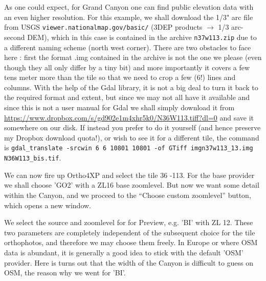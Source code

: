 \documentclass[12pt]{article}
\begin{document}
As one could expect, for Grand Canyon one can find public elevation data with an even higher resolution.
For this example, we shall download the 1/3" arc file from USGS {\tt viewer.nationalmap.gov/basic/} (3DEP products $\rightarrow$ 1/3 arc-second DEM), which in this case is contained in the archive {\tt n37w113.zip} due to a different naming scheme (north west corner). There are two obstacles to face here : first the format .img contained in the archive is not the one we please (even though they all only differ by a tiny bit) and more importantly it covers a few tens meter more than the tile so that we need to crop a few (6!) lines and columns.
With the help of the Gdal library, it is not a big deal to turn it back to the required format and extent, but since we may not all have it available and since this is not a user manual for Gdal we shall simply download it from \href{https://www.dropbox.com/s/gd902e1m4xhr5k0/N36W113.tiff?dl=0}{https://www.dropbox.com/s/gd902e1m4xhr5k0/N36W113.tiff?dl=0} and save it somewhere on our disk. If instead you prefer to do it yourself (and hence preserve my Dropbox download quota!), or wish to see it for a different tile, the command is {\tt gdal\_translate -srcwin 6 6 10801 10801 -of GTiff imgn37w113\_13.img  N36W113\_bis.tif}.


We can now fire up Ortho4XP and select the tile 36 -113. For the base provider we shall choose 'GO2' with a ZL16 base zoomlevel. But now we want some detail within the Canyon, and we proceed to the ``Choose custom zoomlevel'' button, which opens a new window.

We select the source and zoomlevel for for Preview, e.g. 'BI' with ZL 12. These two parameters are completely independent of the subsequent choice for the tile orthophotos, and therefore we may choose them freely. In Europe or where OSM data is abundant, it is generally a good idea to stick with the default 'OSM' provider. Here is turns out that the width of the Canyon is difficult to guess on OSM, the reason why we went for 'BI'.
\end{document}
